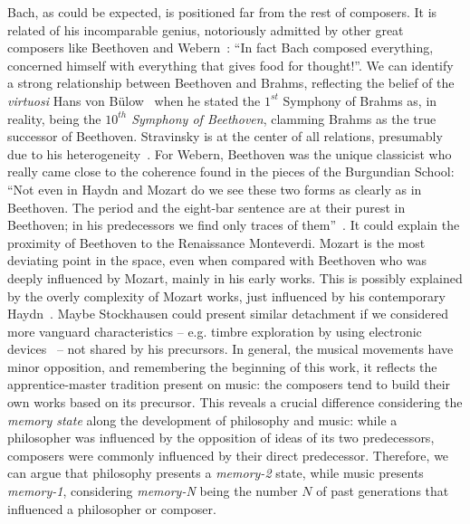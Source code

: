 \documentclass[
 aip,
 jmp,
 amsmath,amssymb,
 reprint,
]{revtex4-1}
\begin{document}
Bach, as could be expected, is positioned far from the rest of
composers. It is related of his incomparable genius, notoriously
admitted by other great composers like Beethoven and
Webern~\cite{Webern}: ``In fact Bach composed everything, concerned
himself with everything that gives food for thought!''. 
We can identify a strong relationship between
Beethoven and Brahms, reflecting the belief of the \textit{virtuosi} Hans von B\"{u}low~\cite{Bulow} when he
stated the $1^{st}$ Symphony of Brahms as, in reality, being the \textit{$10^{th}$ Symphony of
Beethoven}, clamming Brahms as the true successor of Beethoven. Stravinsky is at the center of all
relations, presumably due to his heterogeneity~\cite{BennettHistory, Lovelock}.
For Webern, Beethoven was the unique classicist who really came close
to the coherence found in the pieces of the Burgundian School: ``Not even
in Haydn and Mozart do we see these two forms as clearly as in
Beethoven. The period and the eight-bar sentence are at their purest
in Beethoven; in his predecessors we find only traces of them''~\cite{Webern}. It
could explain the proximity of Beethoven to the Renaissance  Monteverdi.
Mozart is the most deviating point in the space, even when compared with
Beethoven who was deeply influenced by Mozart, mainly in his early works. This
is possibly explained by the overly complexity of Mozart works, just influenced by his contemporary Haydn~\cite{Lovelock}.
Maybe Stockhausen could present similar detachment if we considered
more vanguard characteristics -- e.g. timbre exploration by using
electronic devices~\cite{Lovelock} -- not
shared by his precursors.
In general, the musical movements have minor opposition, and
remembering the beginning of this work, it reflects the apprentice-master
tradition present on music: the composers tend to build their own
works based on its precursor. This reveals a crucial difference
considering the \textit{memory state} along the development of
philosophy and music: while a philosopher was influenced by the
opposition of ideas of its two predecessors, composers were commonly
influenced by their direct predecessor. Therefore, we can argue that philosophy
presents a \textit{memory-2} state, while music presents
\textit{memory-1}, considering \textit{memory-N} being the number $N$
of past generations that influenced a philosopher or composer.

\end{document}
